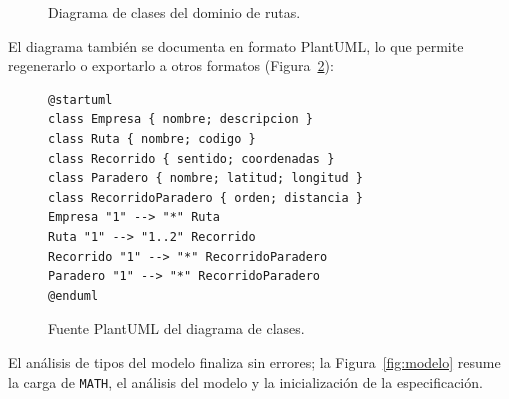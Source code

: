 \begin{figure}[!t]
\centering
{}
\caption{Diagrama de clases del dominio de rutas.}
\label{fig:clases}
\end{figure}

El diagrama también se documenta en formato PlantUML, lo que permite
regenerarlo o exportarlo a otros formatos
(Figura~\ref{fig:codigo-plantuml}):

\begin{figure}[!t]
\centering
\begin{lstlisting}
@startuml
class Empresa { nombre; descripcion }
class Ruta { nombre; codigo }
class Recorrido { sentido; coordenadas }
class Paradero { nombre; latitud; longitud }
class RecorridoParadero { orden; distancia }
Empresa "1" --> "*" Ruta
Ruta "1" --> "1..2" Recorrido
Recorrido "1" --> "*" RecorridoParadero
Paradero "1" --> "*" RecorridoParadero
@enduml
\end{lstlisting}
\caption{Fuente PlantUML del diagrama de clases.}
\label{fig:codigo-plantuml}
\end{figure}

El análisis de tipos del modelo finaliza sin errores; la Figura~\ref{fig:modelo} resume la carga de \texttt{MATH}, el análisis del modelo y la inicialización de la especificación.
